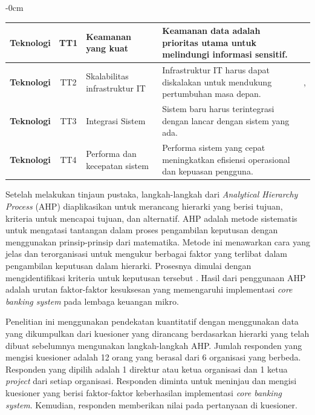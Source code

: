 \documentclass[journal,article,submit,pdftex,moreauthors]{Definitions/mdpi}
\begin{document}
\begin{table}[H]
\begin{adjustwidth}{-\extralength}{0cm}
\begin{tabular}{c|c|p{4cm}|p{6cm}|c}
        \textbf{Teknologi} & TT1 & \raggedright Keamanan yang kuat & \raggedright Keamanan data adalah prioritas utama untuk melindungi informasi sensitif. & \cite{falisat-csf} \\ 
        \midrule
        \textbf{Teknologi} & TT2 & \raggedright Skalabilitas infrastruktur IT & \raggedright Infrastruktur IT harus dapat diskalakan untuk mendukung pertumbuhan masa depan. & \cite{Ghafari-csf}, \cite{salu-csf} \\ 
        \midrule
        \textbf{Teknologi} & TT3 & \raggedright Integrasi Sistem & \raggedright Sistem baru harus terintegrasi dengan lancar dengan sistem yang ada. & \cite{Ghafari-csf} \\ 
        \midrule
        \textbf{Teknologi} & TT4 & \raggedright Performa dan kecepatan sistem & \raggedright Performa sistem yang cepat meningkatkan efisiensi operasional dan kepuasan pengguna. & \cite{Ghafari-csf} \\ 
        \bottomrule
    \end{tabular}
\end{adjustwidth}
\end{table}


Setelah melakukan tinjaun pustaka, langkah-langkah dari \textit{Analytical Hierarchy Process} (AHP) diaplikasikan untuk merancang hierarki yang berisi tujuan, kriteria untuk mencapai tujuan, dan alternatif. AHP adalah metode sistematis untuk mengatasi tantangan dalam proses pengambilan keputusan dengan menggunakan prinsip-prinsip dari matematika. Metode ini menawarkan cara yang jelas dan terorganisasi untuk mengukur berbagai faktor yang terlibat dalam pengambilan keputusan dalam hierarki. Prosesnya dimulai dengan mengidentifikasi kriteria untuk keputusan tersebut \cite{Tavana2021AnalyticalHP}. Hasil dari penggunaan AHP adalah urutan faktor-faktor kesuksesan yang memengaruhi implementasi \textit{core banking system} pada lembaga keuangan mikro.

Penelitian ini menggunakan pendekatan kuantitatif dengan menggunakan data yang dikumpulkan dari kuesioner yang dirancang berdasarkan hierarki yang telah dibuat sebelumnya mengunakan langkah-langkah AHP. Jumlah responden yang mengisi kuesioner adalah 12 orang yang berasal dari 6 organisasi yang berbeda. Responden yang dipilih adalah 1 direktur atau ketua organisasi dan 1 ketua \textit{project} dari setiap organisasi. Responden diminta untuk meninjau dan mengisi kuesioner yang berisi faktor-faktor keberhasilan implementasi \textit{core banking system}. Kemudian, responden memberikan nilai pada pertanyaan di kuesioner. 
\end{document}
